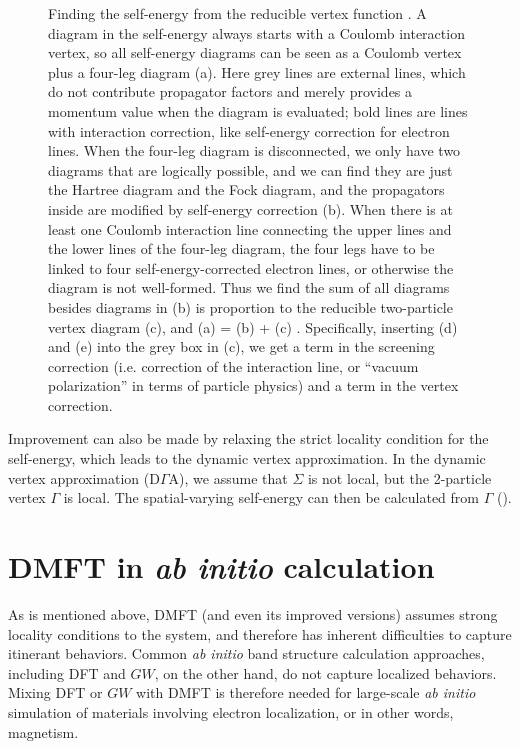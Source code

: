 \documentclass[hyperref, a4paper]{article}
\begin{document}
\begin{figure}
    \centering
    
    \caption{
        Finding the self-energy from the reducible vertex function \cite{bickers1991conserving}.
        A diagram in the self-energy always starts with a Coulomb interaction vertex,
        so all self-energy diagrams can be seen as a Coulomb vertex plus a 
        four-leg diagram (a).
        Here grey lines are external lines, 
        which do not contribute propagator factors and merely provides a momentum value 
        when the diagram is evaluated;
        bold lines are lines with interaction correction,
        like self-energy correction for electron lines.
        When the four-leg diagram is disconnected, we only have two diagrams that are logically possible,
        and we can find they are just the Hartree diagram and the Fock diagram,
        and the propagators inside are modified by self-energy correction (b).
        When there is at least one Coulomb interaction line connecting the upper lines and the lower lines 
        of the four-leg diagram, the four legs have to be linked to four self-energy-corrected electron lines,
        or otherwise the diagram is not well-formed.
        Thus we find the sum of all diagrams besides diagrams in (b) 
        is proportion to the reducible two-particle vertex diagram (c),
        and (a) = (b) + (c) \cite{bickers1991conserving}.
        Specifically, inserting (d) and (e) into the grey box in (c), 
        we get a term in the screening correction 
        (i.e. correction of the interaction line, or ``vacuum polarization'' in terms of particle physics)
        and a term in the vertex correction.
    }
    \label{fig:dga}
\end{figure}

Improvement can also be made by relaxing the strict locality condition for the self-energy,
which leads to the dynamic vertex approximation.
In the dynamic vertex approximation (D$\Gamma$A),
we assume that $\Sigma$ is not local,
but the 2-particle vertex $\Gamma$ is local.
The spatial-varying self-energy can then be calculated from $\Gamma$
(). 

\section{DMFT in \textit{ab initio} calculation}\label{sec:ab-initio}

As is mentioned above, 
DMFT (and even its improved versions)
assumes strong locality conditions to the system,
and therefore has inherent difficulties to capture itinerant behaviors.
Common \textit{ab initio} band structure calculation approaches,
including DFT and $GW$, 
on the other hand, 
do not capture localized behaviors.
Mixing DFT or $GW$ with DMFT is therefore needed 
for large-scale \textit{ab initio} simulation 
of materials involving electron localization,
or in other words, magnetism.
\end{document}
